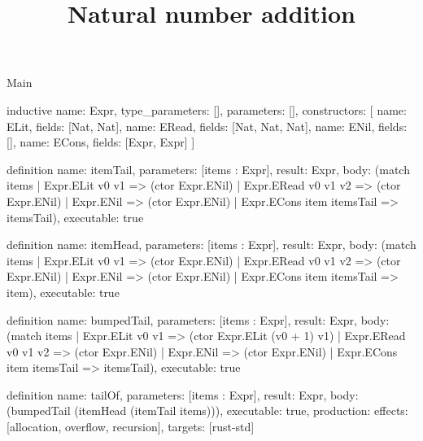 \begin{lexlean}{Main}
\title{Natural number addition}
\begin{semanticmodule}
inductive{
  name: Expr,
  type_parameters: [],
  parameters: [],
  constructors: [
    {name: ELit, fields: [Nat, Nat]},
    {name: ERead, fields: [Nat, Nat, Nat]},
    {name: ENil, fields: []},
    {name: ECons, fields: [Expr, Expr]}
  ]
}

definition{
  name: itemTail,
  parameters: [items : Expr],
  result: Expr,
  body: (match items
    | Expr.ELit v0 v1 => (ctor Expr.ENil)
    | Expr.ERead v0 v1 v2 => (ctor Expr.ENil)
    | Expr.ENil => (ctor Expr.ENil)
    | Expr.ECons item itemsTail => itemsTail),
  executable: true
}

definition{
  name: itemHead,
  parameters: [items : Expr],
  result: Expr,
  body: (match items
    | Expr.ELit v0 v1 => (ctor Expr.ENil)
    | Expr.ERead v0 v1 v2 => (ctor Expr.ENil)
    | Expr.ENil => (ctor Expr.ENil)
    | Expr.ECons item itemsTail => item),
  executable: true
}

definition{
  name: bumpedTail,
  parameters: [items : Expr],
  result: Expr,
  body: (match items
    | Expr.ELit v0 v1 => (ctor Expr.ELit (v0 + 1) v1)
    | Expr.ERead v0 v1 v2 => (ctor Expr.ENil)
    | Expr.ENil => (ctor Expr.ENil)
    | Expr.ECons item itemsTail => itemsTail),
  executable: true
}

definition{
  name: tailOf,
  parameters: [items : Expr],
  result: Expr,
  body: (bumpedTail (itemHead (itemTail items))),
  executable: true,
  production: {effects: [allocation, overflow, recursion], targets: [rust-std]}
}
\end{semanticmodule}
\end{lexlean}
